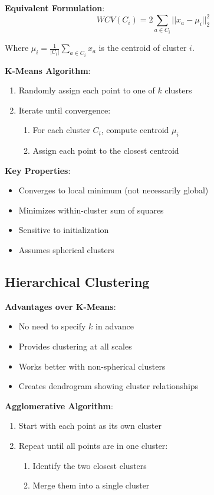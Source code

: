 \documentclass{article}
\begin{document}
\textbf{Equivalent Formulation}:
$$WCV(C_i) = 2\sum_{a \in C_i} ||x_a - \mu_i||_2^2$$

Where $\mu_i = \frac{1}{|C_i|}\sum_{a \in C_i} x_a$ is the centroid of cluster $i$.

\textbf{K-Means Algorithm}:
\begin{enumerate}
    \item Randomly assign each point to one of $k$ clusters
    \item Iterate until convergence:
    \begin{enumerate}
        \item For each cluster $C_i$, compute centroid $\mu_i$
        \item Assign each point to the closest centroid
    \end{enumerate}
\end{enumerate}

\textbf{Key Properties}:
\begin{itemize}
    \item Converges to local minimum (not necessarily global)
    \item Minimizes within-cluster sum of squares
    \item Sensitive to initialization
    \item Assumes spherical clusters
\end{itemize}

\subsection{Hierarchical Clustering}

\textbf{Advantages over K-Means}:
\begin{itemize}
    \item No need to specify $k$ in advance
    \item Provides clustering at all scales
    \item Works better with non-spherical clusters
    \item Creates dendrogram showing cluster relationships
\end{itemize}

\textbf{Agglomerative Algorithm}:
\begin{enumerate}
    \item Start with each point as its own cluster
    \item Repeat until all points are in one cluster:
    \begin{enumerate}
        \item Identify the two closest clusters
        \item Merge them into a single cluster
    \end{enumerate}
\end{enumerate}
\end{document}

